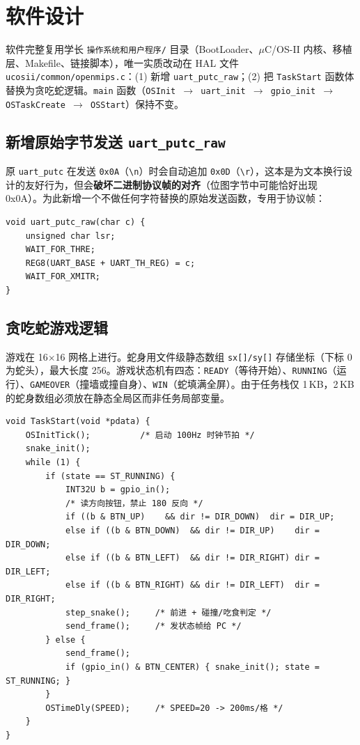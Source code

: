 \section{软件设计}

软件完整复用学长 \texttt{操作系统和用户程序/} 目录（BootLoader、$\mu$C/OS-II 内核、移植层、Makefile、链接脚本），唯一实质改动在 HAL 文件 \texttt{ucosii/common/openmips.c}：(1) 新增 \texttt{uart\_putc\_raw}；(2) 把 \texttt{TaskStart} 函数体替换为贪吃蛇逻辑。\texttt{main} 函数（\texttt{OSInit $\to$ uart\_init $\to$ gpio\_init $\to$ OSTaskCreate $\to$ OSStart}）保持不变。

\subsection{新增原始字节发送 \texttt{uart\_putc\_raw}}

原 \texttt{uart\_putc} 在发送 \texttt{0x0A}（\texttt{\textbackslash n}）时会自动追加 \texttt{0x0D}（\texttt{\textbackslash r}），这本是为文本换行设计的友好行为，但会\textbf{破坏二进制协议帧的对齐}（位图字节中可能恰好出现 0x0A）。为此新增一个不做任何字符替换的原始发送函数，专用于协议帧：

\begin{lstlisting}[style=c, caption={原始字节发送（openmips.c）}]
void uart_putc_raw(char c) {
    unsigned char lsr;
    WAIT_FOR_THRE;
    REG8(UART_BASE + UART_TH_REG) = c;
    WAIT_FOR_XMITR;
}
\end{lstlisting}

\subsection{贪吃蛇游戏逻辑}

游戏在 16$\times$16 网格上进行。蛇身用文件级静态数组 \texttt{sx[]/sy[]} 存储坐标（下标 0 为蛇头），最大长度 256。游戏状态机有四态：\texttt{READY}（等待开始）、\texttt{RUNNING}（运行）、\texttt{GAMEOVER}（撞墙或撞自身）、\texttt{WIN}（蛇填满全屏）。由于任务栈仅 1\,KB，2\,KB 的蛇身数组必须放在静态全局区而非任务局部变量。

\begin{lstlisting}[style=c, caption={TaskStart 主循环（节选）}]
void TaskStart(void *pdata) {
    OSInitTick();          /* 启动 100Hz 时钟节拍 */
    snake_init();
    while (1) {
        if (state == ST_RUNNING) {
            INT32U b = gpio_in();
            /* 读方向按钮，禁止 180 反向 */
            if ((b & BTN_UP)    && dir != DIR_DOWN)  dir = DIR_UP;
            else if ((b & BTN_DOWN)  && dir != DIR_UP)    dir = DIR_DOWN;
            else if ((b & BTN_LEFT)  && dir != DIR_RIGHT) dir = DIR_LEFT;
            else if ((b & BTN_RIGHT) && dir != DIR_LEFT)  dir = DIR_RIGHT;
            step_snake();     /* 前进 + 碰撞/吃食判定 */
            send_frame();     /* 发状态帧给 PC */
        } else {
            send_frame();
            if (gpio_in() & BTN_CENTER) { snake_init(); state = ST_RUNNING; }
        }
        OSTimeDly(SPEED);     /* SPEED=20 -> 200ms/格 */
    }
}
\end{lstlisting}

